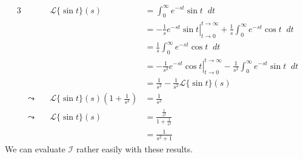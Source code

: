 \documentclass[a4paper]{article}
\newcommand*\diff{\mathop{}\!d} %
\theoremstyle{definition}
\begin{document}
\begin{alignat*}{3}
     &                & \mathscr{L}\{\sin t\}(s)                                & = \int_{0}^{\infty} e^{-st}\sin t \diff t                                                                                       \\
     &                &                                                         & = \left. - \frac{1}{s} e^{-st} \sin t \right|_{t\to 0}^{t\to \infty} + \frac{1}{s} \int_{0}^{\infty} e^{-st} \cos t \diff t     \\
     &                &                                                         & = \frac{1}{s} \int_{0}^{\infty} e^{-st} \cos t \diff t                                                                          \\
     &                &                                                         & = \left. - \frac{1}{s^2} e^{-st} \cos t \right|_{t\to 0}^{t\to \infty} - \frac{1}{s^2} \int_{0}^{\infty} e^{-st} \sin t \diff t \\
     &                &                                                         & =  \frac{1}{s^2} - \frac{1}{s^2} \mathscr{L}\{\sin t\}(s)                                                                       \\
     & \leadsto \quad & \mathscr{L}\{\sin t\}(s) \left(1 + \frac{1}{s^2}\right) & = \frac{1}{s^2}                                                                                                                 \\
     & \leadsto\quad  & \mathscr{L}\{\sin t\}(s)                                & = \frac{\frac{1}{s^2}}{1 + \frac{1}{s^2}}                                                                                       \\
     &                &                                                         & = \frac{1}{s^2 + 1}
\end{alignat*}
We can evaluate $\mathcal{I}$ rather easily with these results.
\end{document}
